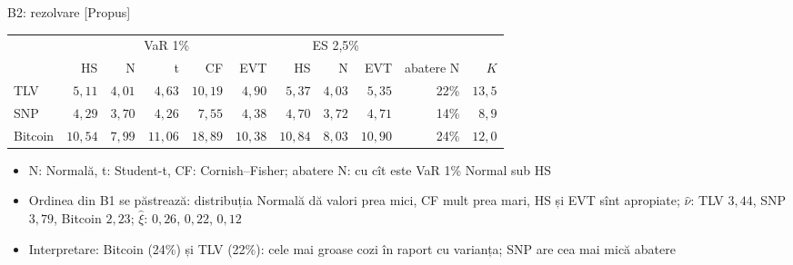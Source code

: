 \ifsolutions
\begin{frame}{B2: rezolvare [Propus]}
\itemsize{\footnotesize}
\begin{center}
\scriptsize
\begin{tabular}{l|rrrrr|rrr|rr}
\toprule
& \multicolumn{5}{c|}{VaR 1\%} & \multicolumn{3}{c|}{ES 2,5\%} & & \\ & HS & N & t & CF & EVT & HS & N & EVT & abatere N & $K$ \\
\midrule
TLV & $5{,}11$ & $4{,}01$ & $4{,}63$ & $10{,}19$ & $4{,}90$ & $5{,}37$ & $4{,}03$ & $5{,}35$ & 22\% & ${13{,}5}$ \\
SNP & $4{,}29$ & $3{,}70$ & $4{,}26$ & $7{,}55$ & $4{,}38$ & $4{,}70$ & $3{,}72$ & $4{,}71$ & 14\% & ${8{,}9}$ \\
Bitcoin & $10{,}54$ & $7{,}99$ & $11{,}06$ & $18{,}89$ & $10{,}38$ & $10{,}84$ & $8{,}03$ & $10{,}90$ & 24\% & ${12{,}0}$ \\
\bottomrule
\end{tabular}
\end{center}
\begin{itemize}
    \item N: Normală, t: Student-t, CF: Cornish--Fisher; abatere N: cu cît este VaR 1\% Normal sub HS
    \item Ordinea din B1 se păstrează: distribuția Normală dă valori prea mici, CF mult prea mari, HS și EVT sînt apropiate; $\hat\nu$: TLV $3{,}44$, SNP $3{,}79$, Bitcoin $2{,}23$; $\hat\xi$: $0{,}26$, $0{,}22$, $0{,}12$
    \item Interpretare: Bitcoin (24\%) și TLV (22\%): cele mai groase cozi în raport cu varianța; SNP are cea mai mică abatere
\end{itemize}
\end{frame}
\fi

